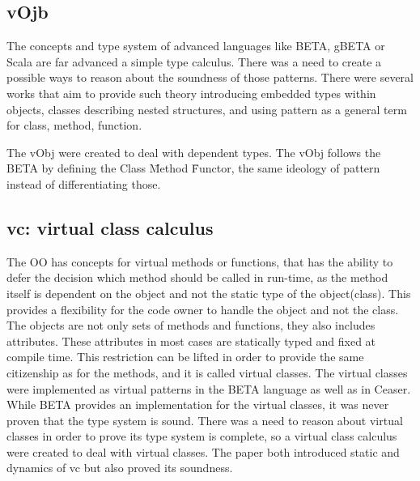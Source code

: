 \documentclass[a4paper, 10pt, conference ]{llncs}
\let\cite\parencite
\begin{document}
\subsection{vOjb}

The concepts and type system of advanced languages like BETA, gBETA or Scala are far advanced a simple type calculus. There was a need to create a possible ways to reason about the soundness\cite{wright1994syntactic} of those patterns. There were several works that aim to provide such theory introducing embedded types within objects, classes describing nested structures, and using pattern as a general term for class, method, function.

The vObj\cite{odersky2003nominal} were created to deal with dependent types. The vObj follows the BETA by defining the Class \= Method \= Functor, the same ideology of pattern instead of differentiating those. 

\subsection{vc: virtual class calculus}

The OO has concepts for virtual methods or functions, that has the ability to defer the decision which method should be called in run-time, as the method itself is dependent on the object and not the static type of the object(class). This provides a flexibility for the code owner to handle the object and not the class. The objects are not only sets of methods and functions, they also includes attributes. These attributes in most cases are statically typed and fixed at compile time. This restriction can be lifted in order to provide the same citizenship as for the methods, and it is called virtual classes. The virtual classes were implemented as virtual patterns in the BETA\cite{madsen1989virtual} language as well as in Ceaser\cite{aracic2006overview}. While BETA provides an implementation for the virtual classes, it was never proven that the type system is sound. There was a need to reason about virtual classes in order to prove its type system is complete, so a virtual class calculus\cite{ernst2006virtual} were created to deal with virtual classes. The paper both introduced static and dynamics of vc but also proved its soundness.


\printbibliography
\end{document}

